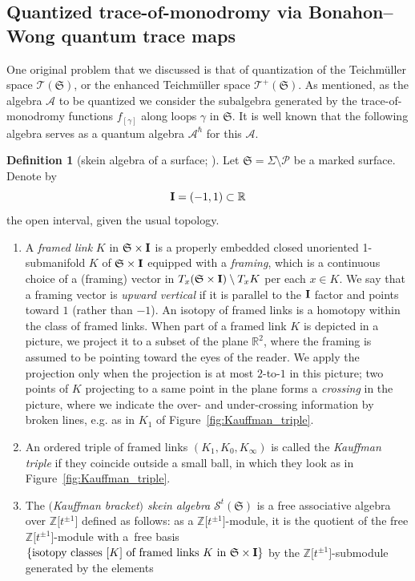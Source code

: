 \documentclass[pdftex]{sigma}
\numberwithin{equation}{section}
\theoremstyle{definition}
\newtheorem{Definition}[Theorem]{Definition}
\begin{document}
\subsection{Quantized trace-of-monodromy via Bonahon--Wong quantum trace maps}
\label{subsec:quantized_trace-of-monodromy}
One original problem that we discussed is that of quantization of the Teichm\"uller space $\mathscr{T}(\mathfrak{S})$, or the enhanced Teichm\"uller space $\mathscr{T}^+(\mathfrak{S})$. As mentioned, as the algebra $\mathcal{A}$ to be quantized we consider the subalgebra generated by the trace-of-monodromy functions $f_{[\gamma]}$ along loops $\gamma$ in $\mathfrak{S}$. It is well known that the following algebra serves as a quantum algebra $\mathcal{A}^\hbar$ for this $\mathcal{A}$.
\begin{Definition}[skein algebra of a surface; \cite{Pr, Turaev}]
\label{def:skein_algebra}
Let $\mathfrak{S} = \Sigma \setminus \mathcal{P}$ be a marked surface. Denote by
\[
{\bf I} = (-1,1) \subset \mathbb{R}
\]
the open interval, given the usual topology.
\begin{enumerate}[label={\rm (SA\arabic*)}]\itemsep=0pt \setlength{\leftskip}{0.22cm}
\item A {\em framed link} $K$ in $\mathfrak{S} \times {\bf I}$ is a properly embedded closed unoriented 1-submanifold $K$ of $\mathfrak{S}\times {\bf I}$ equipped with a {\em framing}, which is a continuous choice of a (framing) vector in $T_x(\mathfrak{S} \times {\bf I}) \setminus T_x K$ per each $x\in K$. We say that a framing vector is {\em upward vertical} if it is parallel to the ${\bf I}$ factor and points toward $1$ (rather than $-1$). An isotopy of framed links is a homotopy within the class of framed links.
When part of a framed link $K$ is depicted in a picture, we project it to a subset of the plane $\mathbb{R}^2$, where the framing is assumed to be pointing toward the eyes of the reader. We apply the projection only when the projection is at most $2$-to-$1$ in this picture; two points of $K$ projecting to a same point in the plane forms a {\em crossing} in the picture, where we indicate the over- and under-crossing information by broken lines, e.g. as in $K_1$ of Figure~\ref{fig:Kauffman_triple}.
\item An ordered triple of framed links $(K_1,K_0,K_\infty)$ is called the {\em Kauffman triple} if they coincide outside a small ball, in which they look as in Figure~\ref{fig:Kauffman_triple}.
\item The {\em $($Kauffman bracket$)$ skein algebra} $\mathcal{S}^t(\mathfrak{S})$ is a free associative algebra over $\mathbb{Z}\bigl[t^{\pm 1}\bigr]$ defined as follows: as a $\mathbb{Z}\bigl[t^{\pm 1}\bigr]$-module, it is the quotient of the free $\mathbb{Z}\bigl[t^{\pm 1}\bigr]$-module with a~free basis $\{\mbox{isotopy classes $[K]$ of framed links $K$ in $\mathfrak{S} \times {\bf I}$}\}$ by the $\mathbb{Z}\bigl[t^{\pm 1}\bigr]$-submodule generated by the elements

\end{enumerate}
\end{Definition}
\end{document}
